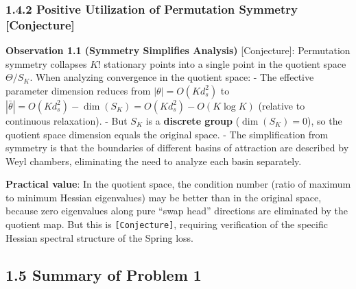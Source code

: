 \documentclass[
  12pt,
]{article}
\begin{document}
\subsubsection{1.4.2 Positive Utilization of Permutation Symmetry [Conjecture]}\label{positive-utilization-permutation}

\textbf{Observation 1.1 (Symmetry Simplifies Analysis)} [Conjecture]: Permutation symmetry collapses $K!$ stationary points into a single point in the quotient space $\Theta/S_K$. When analyzing convergence in the quotient space:
- The effective parameter dimension reduces from $|\theta| = O(K d_s^2)$ to $|\bar{\theta}| = O(K d_s^2) - \dim(S_K) = O(K d_s^2) - O(K \log K)$ (relative to continuous relaxation).
- But $S_K$ is a \textbf{discrete group} ($\dim(S_K) = 0$), so the quotient space dimension equals the original space.
- The simplification from symmetry is that the boundaries of different basins of attraction are described by Weyl chambers, eliminating the need to analyze each basin separately.

\textbf{Practical value}: In the quotient space, the condition number (ratio of maximum to minimum Hessian eigenvalues) may be better than in the original space, because zero eigenvalues along pure ``swap head'' directions are eliminated by the quotient map. But this is \texttt{[Conjecture]}, requiring verification of the specific Hessian spectral structure of the Spring loss.

\subsection{1.5 Summary of Problem 1}\label{summary-problem-1}
\end{document}

